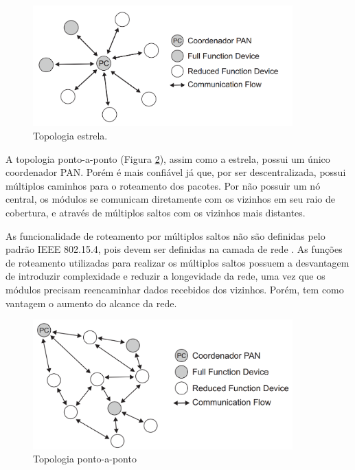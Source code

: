 \begin{figure}[h!]
    \centering
    \includegraphics[width=10cm]{figs/TopologiaEstrelaSemprebom.png}
    \caption{Topologia estrela. \cite{SEMPREBOM} }
    \label{TopologiaEstrelaSemprebom}
\end{figure}

A topologia ponto-a-ponto (Figura \ref{TopologiaPontoAPontoSemprebom}), assim como a estrela, possui um único coordenador \ac{PAN}. Porém é mais confiável já que, por ser descentralizada, possui múltiplos caminhos para o roteamento dos pacotes. Por não possuir um nó central, os módulos se comunicam diretamente com os vizinhos em seu raio de cobertura, e através de múltiplos saltos com os vizinhos mais distantes. 

As funcionalidade de roteamento por múltiplos saltos não são definidas pelo padrão IEEE 802.15.4, pois devem ser definidas na camada de rede \cite{SEMPREBOM}. As funções de roteamento utilizadas para realizar os múltiplos saltos possuem a desvantagem de introduzir complexidade e reduzir a longevidade da rede, uma vez que os módulos precisam reencaminhar dados recebidos dos vizinhos. Porém, tem como vantagem o aumento do alcance da rede. 
\newpage
\begin{figure}[h!]
    \centering
    \includegraphics[width=10cm]{figs/TopologiaPontoAPontoSemprebom.png}
    \caption{Topologia ponto-a-ponto \cite{SEMPREBOM}}
    \label{TopologiaPontoAPontoSemprebom}
\end{figure}


